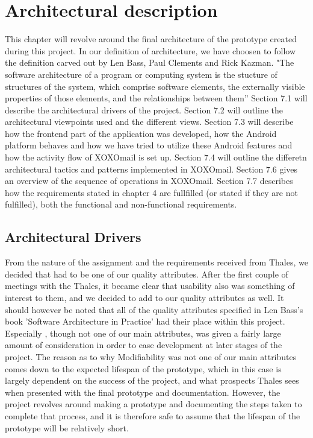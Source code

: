 \chapter{Architectural description}\label{chapter_architecture}
	This chapter will revolve around the final architecture of the prototype created during this project. In our definition of architecture, we have choosen to follow the definition carved out by
	Len Bass, Paul Clements and Rick Kazman. 
	\newline
	\newline
	"The software architecture of a program or computing system is the stucture of structures of the system, which comprise software elements, the externally visible properties of those elements, and the relationships between them''\cite[p. 3]{bib:archi}
	\newline
	\newline
	Section 7.1 will describe the architectural drivers of the project. Section 7.2 will outline the architectural viewpoints used and the different views. Section 7.3 will describe how the frontend part of the application was developed, how the Android platform behaves and how we have tried to utilize these Android features and how the activity flow of XOXOmail is set up. Section 7.4 will outline the differetn architectural tactics and patterns implemented in XOXOmail. Section 7.6 gives an overview of the sequence of operations in XOXOmail. Section 7.7 describes how the requirements stated in chapter 4 are fullfilled (or stated if they are not fulfilled), both the functional and non-functional requirements.  
	
\section{Architectural Drivers}
	From the nature of the assignment and the requirements received from Thales, we decided that  had to be one of our quality attributes. After the first couple of meetings with the Thales, it became clear that usability also was something of interest to them, and we decided to add  to our quality attributes as well. It should however be noted that all of the quality attributes specified in Len Bass's book 'Software Architecture in Practice'\cite{bib:archi} had their place within this project. Especially , though not one of our main attributes, was given a fairly large amount of consideration in order to ease development at later stages of the project. The reason as to why Modifiability was not one of our main attributes comes down to the expected lifespan of the prototype, which in this case is largely dependent on the success of the project, and what prospects Thales sees when presented with the final prototype and documentation. However, the project revolves around making a prototype and documenting the steps taken to complete that process, and it is therefore safe to assume that the lifespan of the prototype will be relatively short. 

